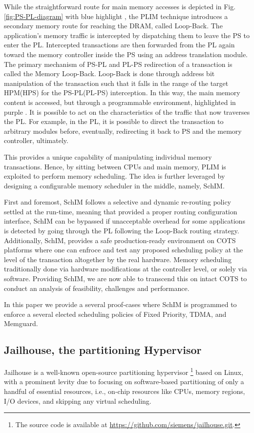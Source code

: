 While the straightforward route for main memory accesses is depicted in Fig. \ref{fig:PS-PL-diagram} with blue highlight , the PLIM technique introduces a secondary memory route for reaching the DRAM, called Loop-Back. The application's memory traffic is intercepted by dispatching them to leave the PS to enter the PL. Intercepted transactions are then forwarded from the PL again toward the memory controller inside the PS using an address translation module. The primary mechanism of PS-PL and PL-PS redirection of a transaction is called the Memory Loop-Back. Loop-Back is done through address bit manipulation of the transaction such that it falls in the range of the target HPM(HPS) for the PS-PL(PL-PS) interception. In this way, the main memory content is accessed, but through a programmable environment, highlighted in purple . It is possible to act on the characteristics of the traffic that now traverses the PL. For example, in the PL, it is possible to direct the transaction to arbitrary modules before, eventually, redirecting it back to PS and the memory controller, ultimately.

    This provides a unique capability of manipulating individual memory transactions. Hence, by sitting between CPUs and main memory, PLIM is exploited to perform memory scheduling. The idea is further leveraged by designing a configurable memory scheduler in the middle, namely, SchIM.


First and foremost, SchIM follows a selective and dynamic re-routing policy settled at the run-time, meaning that provided a proper routing configuration interface,  SchIM can be bypassed if unacceptable overhead for some applications is detected by going through the PL following the Loop-Back routing strategy. Additionally, SchIM, provides a safe production-ready environment on COTS platforms where one can enfroce and test any proposed scheduling policy at the level of the transaction altogether by the real hardware. Memory scheduling traditionally done via hardware modifications at the controller level, or solely via software. Providing SchIM, we are now able to transcend this on intact COTS to conduct an analysis of feasibility, challenges and performance. 


In this paper we provide a several proof-cases where SchIM is programmed to enforce a several elected scheduling policies of Fixed Priority, TDMA, and Memguard. 






  \subsection{Jailhouse, the partitioning Hypervisor}
    Jailhouse is a well-known open-source partitioning hypervisor \footnote{The source code is available at \url{https://github.com/siemens/jailhouse.git}.} based on Linux,
     with a prominent levity due to focusing on software-based partitioning of only a handful of essential resources, i.e., on-chip resources like CPUs, memory regions, I/O devices, and skipping any virtual scheduling.

